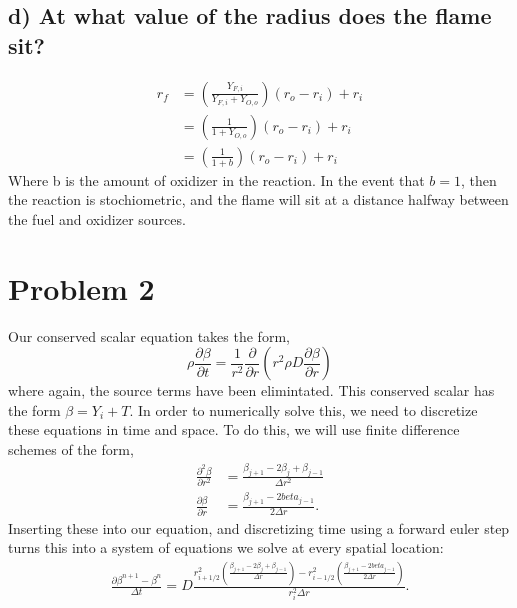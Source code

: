\documentclass{article}
\begin{document}
\subsection*{d) At what value of the radius does the flame sit?}

\begin{eqnarray*}
 r_f &= \left(\frac{Y_{F,i}}{Y_{F,i} + Y_{O,o}} \right)(r_o - r_i) + r_i \\
     &= \left(\frac{1}{1 + Y_{O,o}} \right)(r_o - r_i) + r_i \\
     &= \left(\frac{1}{1 + b} \right)(r_o - r_i) + r_i 
\end{eqnarray*}
Where b is the amount of oxidizer in the reaction. In the event that
$b=1$, then the reaction is stochiometric, and the flame will sit at a
distance halfway between the fuel and oxidizer sources. 

\newpage
\section*{Problem 2}

Our conserved scalar equation takes the form,
\begin{equation*}
 \rho \frac{\partial \beta}{\partial t} = \frac{1}{r^2}\frac{\partial
  }{\partial r}\left( r^2 \rho D \frac{\partial \beta}{\partial r}
	       \right) 
\end{equation*}
where again, the source terms have been elimintated. This conserved
scalar has the form $\beta = Y_i + T$. In order to numerically solve
this, we need to discretize these equations in time and space. To do
this, we will use finite difference schemes of the form,
\begin{eqnarray*}
 \frac{\partial^2 \beta}{\partial r^2} &= \frac{\beta_{j+1}-2 \beta_j +
  \beta_{j-1}}{\Delta r^2}\\
 \frac{\partial \beta}{\partial r} &= \frac{\beta_{j+1}-2
 beta_{j-1}}{2\Delta r}.
\end{eqnarray*}
Inserting these into our equation, and discretizing time using a forward
euler step turns this into a system of equations we solve at every
spatial location:
\begin{eqnarray*}
\frac{\partial \beta^{n+1} - \beta^{n}}{\Delta t} = D \frac{r^2_{i+1/2}
 \left(\frac{\beta_{j+1}-2 \beta_j + \beta_{j-1}}{\Delta r}\right) -
 r^2_{i-1/2}\left(\frac{\beta_{j+1}-2 beta_{j-1}}{2\Delta r}\right)}{r^2_i\Delta r}.
\end{eqnarray*}
\end{document}
